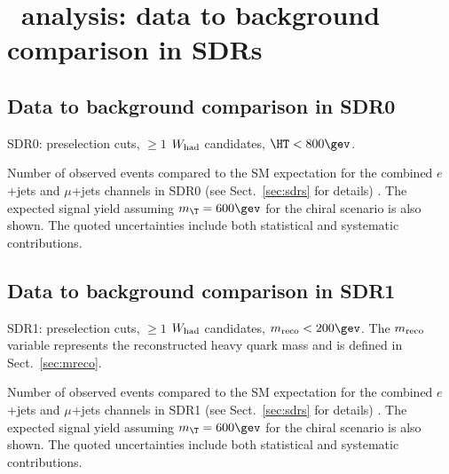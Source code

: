 \clearpage{\pagestyle{empty}\cleardoublepage}

\chapter{\wbx\ analysis: data to background comparison in SDRs}\label{app:wbxSDRs}

\section{Data to background comparison in SDR0}
\label{sec:DataMC_CR0}

SDR0: preselection cuts, $\geq 1$ $W_{\rm had}$ candidates, $\HT<800\gev$. 

\begin{table}[h!]
\begin{center}

\caption{\small{Number of observed events compared to the SM expectation for
the combined $e$+jets and $\mu$+jets channels in SDR0 (see Sect.~\ref{sec:sdrs} for details) . 
The expected signal yield assuming $m_{\T}=600\gev$ for the chiral scenario is also shown. 
The quoted uncertainties include both statistical and systematic contributions.}}
\label{tab:CR0_1W_evtable}
\end{center}
\end{table}

\clearpage


\clearpage

\section{Data to background comparison in SDR1}
\label{sec:DataMC_CR5}

SDR1: preselection cuts, $\geq 1$ $W_{\rm had}$ candidates, $m_{\rm reco}<200\gev$. The $m_{\rm reco}$ variable represents the
reconstructed heavy quark mass and is defined in Sect.~\ref{sec:mreco}. 

\begin{table}[h!]
\begin{center}

\caption{\small{Number of observed events compared to the SM expectation for
the combined $e$+jets and $\mu$+jets channels in SDR1 (see Sect.~\ref{sec:sdrs} for details) . 
The expected signal yield assuming $m_{\T}=600\gev$ for the chiral scenario is also shown. 
The quoted uncertainties include both statistical and systematic contributions.}}
\label{tab:CR5_1W_evtable}
\end{center}
\end{table}

